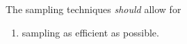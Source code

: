 \documentclass[a4paper, openany, oneside]{memoir}
\begin{document}
The sampling techniques \emph{should} allow for
\begin{enumerate}
    \item sampling as efficient as possible.
\end{enumerate}














\end{document}
